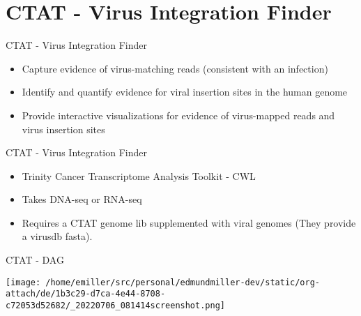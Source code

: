 \documentclass[bigger]{beamer}
\begin{document}
\section*{CTAT - Virus Integration Finder}
\label{sec:orgb5655c7}

\begin{frame}[label={sec:org9c0c05c}]{CTAT - Virus Integration Finder}
\begin{itemize}
\item Capture evidence of virus-matching reads (consistent with an infection)
\item Identify and quantify evidence for viral insertion sites in the human genome
\item Provide interactive visualizations for evidence of virus-mapped reads and
virus insertion sites
\end{itemize}
\end{frame}

\begin{frame}[label={sec:org38192b4}]{CTAT - Virus Integration Finder}
\begin{itemize}
\item Trinity Cancer Transcriptome Analysis Toolkit - CWL
\item Takes DNA-seq or RNA-seq
\item Requires a CTAT genome lib supplemented with viral genomes (They provide a virusdb fasta).
\end{itemize}
\end{frame}

\begin{frame}[label={sec:org04235c6}]{CTAT - DAG}
\begin{center}
\texttt{[image: /home/emiller/src/personal/edmundmiller-dev/static/org-attach/de/1b3c29-d7ca-4e44-8708-c72053d52682/\_20220706\_081414screenshot.png]}
\end{center}
\end{frame}
\end{document}
